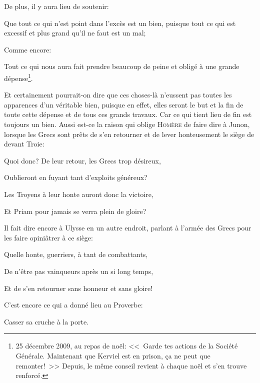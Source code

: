 \bigbreak

De plus, il y aura lieu de soutenir:

\begin{lieu}
	Que tout ce qui n'est point dans l’excès est un bien, puisque tout ce qui est excessif et plus grand qu'il ne
	faut est un mal;
\end{lieu}

\bigbreak

Comme encore:

\begin{lieu}
	Tout ce qui nous aura fait prendre beaucoup de peine et obligé à une grande dépense\footnote{25 décembre 2009,
	au repas de noël: <<~Garde tes actions de la Société Générale. Maintenant que Kerviel est en prison, ça ne peut
	que remonter!~>> Depuis, le même conseil revient à chaque noël et s'en trouve renforcé.}.
\end{lieu}

Et certainement pourrait-on dire que ces choses-là n'eussent pas toutes les apparences d'un véritable bien, puisque en
effet, elles seront le but et la fin de toute cette dépense et de tous ces grands travaux. Car ce qui tient lieu de fin
est toujours un bien. Aussi est-ce la raison qui oblige \textsc{Homère} de faire dire à Junon, lorsque les Grecs sont
prêts de s'en retourner et de lever honteusement le siège de devant Troie:

\begin{emphpar}
	Quoi donc? De leur retour, les Grecs trop désireux,
	
	Oublieront en fuyant tant d'exploits généreux?

	Les Troyens à leur honte auront donc la victoire,
	
	Et Priam pour jamais se verra plein de gloire?
\end{emphpar}

Il fait dire encore à Ulysse en un autre endroit, parlant à l'armée des Grecs pour les faire opiniâtrer à ce siège:

\begin{emphpar}
	Quelle honte, guerriers, à tant de combattants,

	De n'être pas vainqueurs après un si long temps,
	
	Et de s'en retourner sans honneur et sans gloire!
\end{emphpar}

C'est encore ce qui a donné lieu au Proverbe:

\begin{emphpar}
	Casser sa cruche à la porte. 
\end{emphpar}

